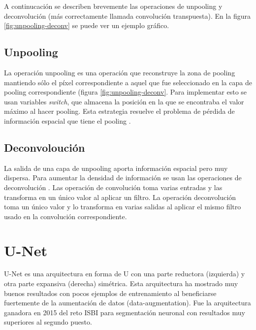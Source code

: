 
A continucación se describen brevemente las operaciones de unpooling y deconvolución (más correctamente llamada convolución transpuesta). En la figura \ref{fig:unpooling-deconv} \cite{Noh2015} se puede ver un ejemplo gráfico.

\subsection{Unpooling}\label{subsec:unpooling}

La operación unpooling es una operación que reconstruye la zona de pooling mantiendo sólo el píxel correspondiente a aquel que fue seleccionado en la capa de pooling correspondiente (figura \ref{fig:unpooling-deconv}. Para implementar esto se usan variables \textit{switch}, que almacena la posición en la que se encontraba el valor máximo al hacer pooling. Esta estrategia resuelve el problema de pérdida de información espacial que tiene el pooling \cite{Zeiler2011}.

\subsection{Deconvoloución}\label{subsec:deconvolution}

La salida de una capa de unpooling aporta información espacial pero muy dispersa. Para aumentar la densidad de información se usan las operaciones de deconvolución \cite{Noh2015}. Las operación de convolución toma varias entradas y las transforma en un único valor al aplicar un filtro. La operación deconvolución toma un único valor y lo transforma en varias salidas al aplicar el mismo filtro usado en la convolución correspondiente.


\section{U-Net}\label{sec:unet}

U-Net es una arquitectura en forma de U con una parte reductora (izquierda) y otra parte expansiva (derecha) simétrica. Esta arquitectura ha mostrado muy buenos resultados con pocos ejemplos de entrenamiento al beneficiarse fuertemente de la aumentación de datos (data-augmentation)\cite{Ronneberger2015}. Fue la arquitectura ganadora en 2015 del reto ISBI para segmentación neuronal con resultados muy superiores al segundo puesto. 

